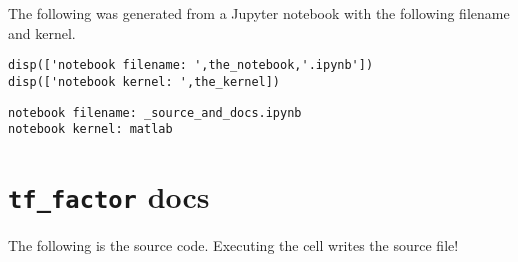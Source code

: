 The following was generated from a Jupyter notebook with the following
filename and kernel.

\begin{verbatim}
disp(['notebook filename: ',the_notebook,'.ipynb'])
disp(['notebook kernel: ',the_kernel])
\end{verbatim}

\begin{verbatim}
notebook filename: _source_and_docs.ipynb
notebook kernel: matlab
\end{verbatim}

\hypertarget{tf_factor-docs}{%
\section{\texorpdfstring{\texttt{tf_factor}
docs}{ docs}}\label{tf_factor-docs}}

The following is the source code. Executing the cell writes the source
file!

